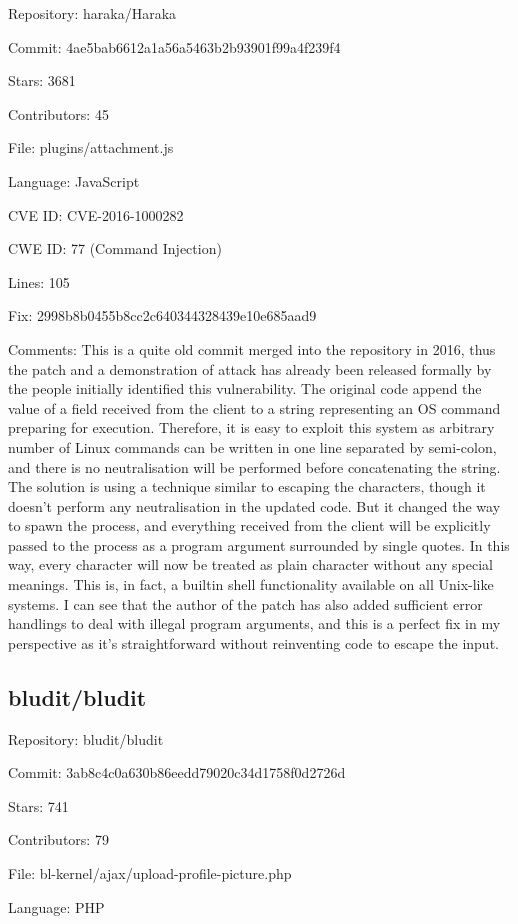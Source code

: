 \documentclass[12pt]{article}
\begin{document}
Repository: haraka/Haraka

Commit: 4ae5bab6612a1a56a5463b2b93901f99a4f239f4

Stars: 3681

Contributors: 45

File: plugins/attachment.js

Language: JavaScript

CVE ID: CVE-2016-1000282

CWE ID: 77 (Command Injection)

Lines: 105

Fix: 2998b8b0455b8cc2c640344328439e10e685aad9

Comments: This is a quite old commit merged into the repository in 2016, thus the patch and a demonstration of attack has already been released formally by the people initially identified this vulnerability. The original code append the value of a field received from the client to a string representing an OS command preparing for execution. Therefore, it is easy to exploit this system as arbitrary number of Linux commands can be written in one line separated by semi-colon, and there is no neutralisation will be performed before concatenating the string. The solution is using a technique similar to escaping the characters, though it doesn't perform any neutralisation in the updated code. But it changed the way to spawn the process, and everything received from the client will be explicitly passed to the process as a program argument surrounded by single quotes. In this way, every character will now be treated as plain character without any special meanings. This is, in fact, a builtin shell functionality available on all Unix-like systems. I can see that the author of the patch has also added sufficient error handlings to deal with illegal program arguments, and this is a perfect fix in my perspective as it's straightforward without reinventing code to escape the input.

\subsection{bludit/bludit}

Repository: bludit/bludit

Commit: 3ab8c4c0a630b86eedd79020c34d1758f0d2726d

Stars: 741

Contributors: 79

File: bl-kernel/ajax/upload-profile-picture.php

Language: PHP
\end{document}
